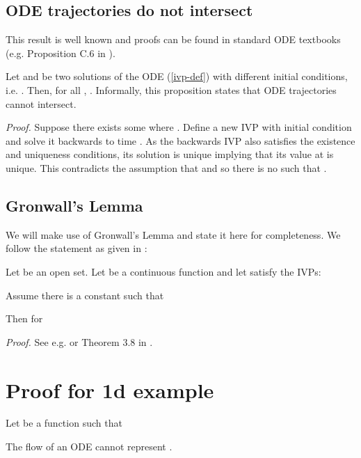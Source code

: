 \documentclass{article}
\begin{document}
\subsection{ODE trajectories do not intersect}

This result is well known and proofs can be found in standard ODE textbooks (e.g. Proposition C.6 in \cite{younes2010shapes}).

\begin{prop*} Let  and  be two solutions of the ODE (\ref{ivp-def}) with different initial conditions, i.e. . Then, for all , . Informally, this proposition states that ODE trajectories cannot intersect.
\end{prop*} \label{trajectories-cant-intersect}

\textit{Proof.} Suppose there exists some  where . Define a new IVP with initial condition  and solve it backwards to time . As the backwards IVP also satisfies the existence and uniqueness conditions, its solution  is unique implying that its value at  is unique. This contradicts the assumption that  and so there is no  such that .

\subsection{Gronwall's Lemma}

We will make use of Gronwall's Lemma and state it here for completeness. We follow the statement as given in \cite{howard1998gronwall}:

\begin{theorem*} Let  be an open set. Let  be a continuous function and let  satisfy the IVPs:


Assume there is a constant  such that

Then for 

\end{theorem*}

\textit{Proof.} See e.g. \cite{howard1998gronwall} or Theorem 3.8 in \cite{younes2010shapes}.

\section{Proof for 1d example} \label{proof-1d}

Let  be a function such that



\begin{customprop}{1} The flow of an ODE cannot represent .
\end{customprop}
\end{document}
